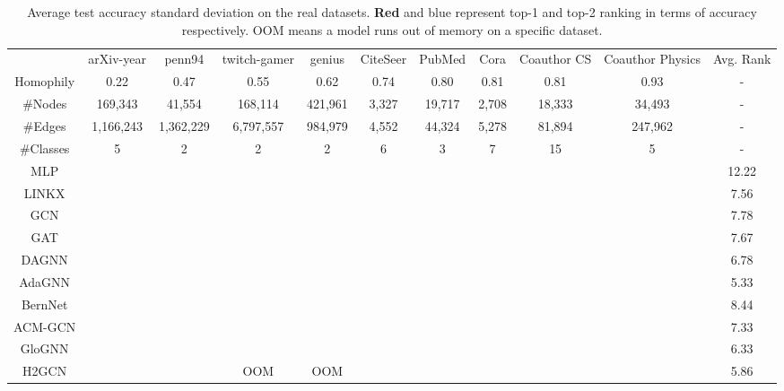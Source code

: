 \documentclass{article}
\theoremstyle{plain}
\begin{document}
\begin{table*}[htb]
\centering
\caption{Average test accuracy  standard deviation on the real datasets. 
{\color{red} \textbf{Red}} and {\color{blue} blue} represent top-1 and top-2 ranking in terms of accuracy respectively. OOM means a model runs out of memory on a specific dataset.}
\label{tab:real-results}
\scriptsize
\tabcolsep=0.01cm
\begin{tabular}{c|ccccccccc|c}
\toprule
      & arXiv-year       & penn94       & twitch-gamer     & genius       & CiteSeer     & PubMed       & Cora     & Coauthor CS      & Coauthor Physics     & Avg. Rank \\
Homophily & 0.22     & 0.47     & 0.55     & 0.62     & 0.74     & 0.80     & 0.81     & 0.81     & 0.93     & -      \\
\#Nodes   & 169,343      & 41,554       & 168,114      & 421,961      & 3,327    & 19,717       & 2,708    & 18,333       & 34,493       & -      \\
\#Edges   & 1,166,243    & 1,362,229    & 6,797,557    & 984,979      & 4,552    & 44,324       & 5,278    & 81,894       & 247,962      & -      \\
\#Classes & 5    & 2    & 2    & 2    & 6    & 3    & 7    & 15       & 5    & -      \\
\midrule
\midrule
MLP       &    &      &    &      &    &     &   &     &        &  12.22      \\
LINKX     & {\color[HTML]{0000FF} } &  &  & {\color[HTML]{0000FF} } &     &     &     &     &     &   7.56     \\
\midrule
GCN       &     &     &     &     &     &     &     &     &     &   7.78     \\
GAT       &     &     &     &     &     &     &     &     &     &    7.67    \\ \midrule
DAGNN     &     &     &     &     & {\color[HTML]{0000FF} } &  & {\color[HTML]{0000FF} } & {\color[HTML]{0000FF} } &     &  6.78     \\
AdaGNN     &     &     &     &     &  &  &  &  &     &   5.33   \\
BernNet    &     &     &     &     &  &  &  &  &     &   8.44    \\
ACM-GCN    &     &     &     &     &  &  &  &  &     &   7.33    \\
GloGNN     &     & {\color[HTML]{FF0000} }    & {\color[HTML]{FF0000} }   &  {\color[HTML]{FF0000} }  &  &  &  &  &     &  6.33     \\
\midrule
H2GCN     &     &       & OOM      & OOM      &     &     &     &     & {\color[HTML]{0000FF} }    &  5.86    \\

\end{tabular}
\end{table*}
\end{document}
